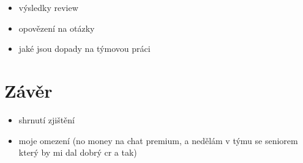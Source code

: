 \documentclass[12pt, a4paper]{article}
\begin{document}
\begin{itemize}
  \item výsledky review
  \item opovězení na otázky
  \item jaké jsou dopady na týmovou práci
\end{itemize}

\section{Závěr}

\begin{itemize}
  \item shrnutí zjištění
  \item moje omezení (no money na chat premium, a nedělám v týmu se seniorem který by mi dal dobrý cr a tak)
\end{itemize}


\end{document}
